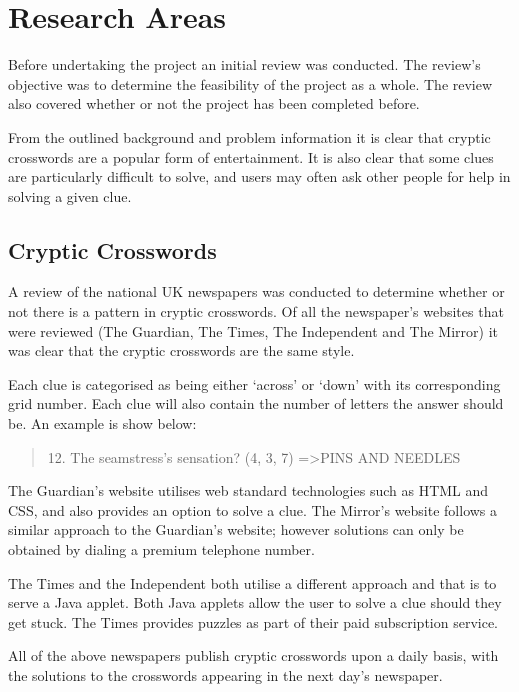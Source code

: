 \section{Research Areas}

Before undertaking the project an initial review was conducted. The review's 
objective was to determine the feasibility of the project as a whole. The 
review also covered whether or not the project has been completed before.

From the outlined background and problem information it is clear that cryptic 
crosswords are a popular form of entertainment. It is also clear that some 
clues are particularly difficult to solve, and users may often ask other people
for help in solving a given clue.


\subsection{Cryptic Crosswords}

A review of the national UK newspapers was conducted to determine whether or 
not there is a pattern in cryptic crosswords. Of all the newspaper's websites 
that were reviewed (The Guardian, The Times, The Independent and The Mirror) it 
was clear that the cryptic crosswords are the same style.

Each clue is categorised as being either `across' or `down' with its 
corresponding grid number. Each clue will also contain the number of letters 
the answer should be. An example is show below:

\begin{quote}
12. The seamstress's sensation? (4, 3, 7) =\textgreater  PINS AND NEEDLES
\end{quote}

The Guardian's website utilises web standard technologies such as HTML and CSS, 
and also provides an option to solve a clue. The Mirror's website follows a 
similar approach to the Guardian’s website; however solutions can only be 
obtained by dialing a premium telephone number.

The Times and the Independent both utilise a different approach and that is to 
serve a Java applet. Both Java applets allow the user to solve a clue should 
they get stuck. The Times provides puzzles as part of their paid subscription 
service.

All of the above newspapers publish cryptic crosswords upon a daily basis, with
the solutions to the crosswords appearing in the next day's newspaper.

